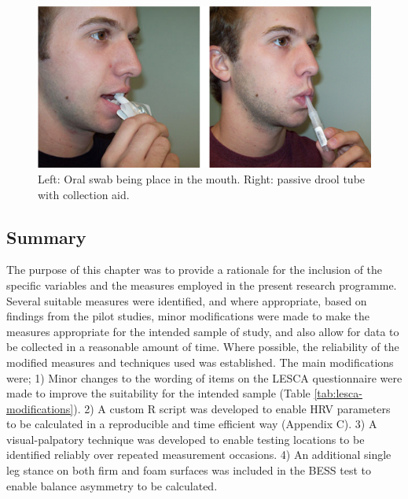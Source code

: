 \documentclass[man,floatsintext]{apa6}
\begin{document}
\begin{figure}[H]

{\centering \includegraphics[width=5.96in]{figs/measures/salivatechniques} 

}

\caption{Left: Oral swab being place in the mouth. Right: passive drool tube with collection aid.}\label{fig:saliva-techniques}
\end{figure}

\hypertarget{summary-1}{%
\subsection{Summary}\label{summary-1}}

The purpose of this chapter was to provide a rationale for the inclusion of the specific variables and the measures employed in the present research programme.
Several suitable measures were identified, and where appropriate, based on findings from the pilot studies, minor modifications were made to make the measures appropriate for the intended sample of study, and also allow for data to be collected in a reasonable amount of time.
Where possible, the reliability of the modified measures and techniques used was established.
The main modifications were;
1) Minor changes to the wording of items on the LESCA questionnaire were made to improve the suitability for the intended sample (Table \ref{tab:lesca-modifications}).
2) A custom R script was developed to enable HRV parameters to be calculated in a reproducible and time efficient way (Appendix C).
3) A visual-palpatory technique was developed to enable testing locations to be identified reliably over repeated measurement occasions.
4) An additional single leg stance on both firm and foam surfaces was included in the BESS test to enable balance asymmetry to be calculated.

\clearpage
\end{document}
